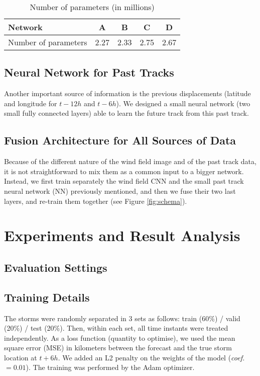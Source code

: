 \begin{table}[]
	\centering
	\caption{Number of parameters (in millions)}
	\begin{tabular}{|l|c|c|c|c|}
		\hline
		Network              & A    & B    & C    & D    \\ \hline
		Number of parameters & 2.27 & 2.33 & 2.75 & 2.67 \\ \hline
	\end{tabular}
\end{table}

\section{Neural Network for Past Tracks}
Another important source of information is the previous displacements
(latitude and longitude
for $t-12h$ and $t-6h$). We designed a small neural network (two small fully connected layers) able to learn the future track from this past track.

\section{Fusion Architecture for All Sources of Data}

Because of the different nature of the wind field image and of the past track data, it is not straightforward to mix them as a common input to a bigger network. Instead, we first train separately the wind field CNN and the small past track neural network (NN) previously mentioned, and then we fuse their two last layers, and re-train them together (see Figure \ref{fig:schema}). %

\chapter{Experiments and Result Analysis}
\section{Evaluation Settings}

\section{Training Details}
The storms were randomly separated in 3 sets as follows: train (60\%) / valid (20\%) / test (20\%).
Then, within each set, all time instants were treated independently.
As a loss function (quantity to optimise), we used the mean square error (MSE) in kilometers between the forecast and the true storm location at $t+6h$. We added an L2 penalty on the weights of the model (\emph{coef.}~$= 0.01$). The training was performed by the Adam optimizer.

